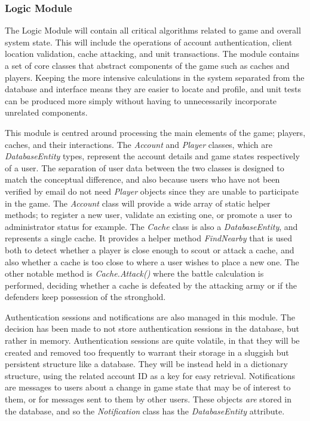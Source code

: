 \subsubsection{Logic Module}
The Logic Module will contain all critical algorithms related to game and overall system state. This will include the operations of account authentication, client location validation, cache attacking, and unit transactions. The module contains a set of core classes that abstract components of the game such as caches and players. Keeping the more intensive calculations in the system separated from the database and interface means they are easier to locate and profile, and unit tests can be produced more simply without having to unnecessarily incorporate unrelated components.

This module is centred around processing the main elements of the game; players, caches, and their interactions. The \emph{Account} and \emph{Player} classes, which are \emph{DatabaseEntity} types, represent the account details and game states respectively of a user. The separation of user data between the two classes is designed to match the conceptual difference, and also because users who have not been verified by email do not need \emph{Player} objects since they are unable to participate in the game. The \emph{Account} class will provide a wide array of static helper methods; to register a new user, validate an existing one, or promote a user to administrator status for example. The \emph{Cache} class is also a \emph{DatabaseEntity}, and represents a single cache. It provides a helper method \emph{FindNearby} that is used both to detect whether a player is close enough to scout or attack a cache, and also whether a cache is too close to where a user wishes to place a new one. The other notable method is \emph{Cache.Attack()} where the battle calculation is performed, deciding whether a cache is defeated by the attacking army or if the defenders keep possession of the stronghold.

Authentication sessions and notifications are also managed in this module. The decision has been made to not store authentication sessions in the database, but rather in memory. Authentication sessions are quite volatile, in that they will be created and removed too frequently to warrant their storage in a sluggish but persistent structure like a database. They will be instead held in a dictionary structure, using the related account ID as a key for easy retrieval. Notifications are messages to users about a change in game state that may be of interest to them, or for messages sent to them by other users. These objects \emph{are} stored in the database, and so the \emph{Notification} class has the \emph{DatabaseEntity} attribute.

